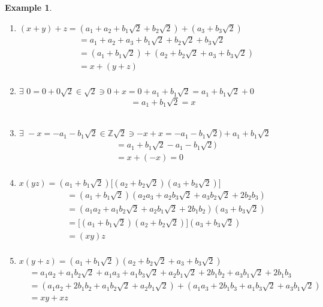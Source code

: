 \documentclass[11pt,a4paper]{article}
\theoremstyle{definition}
\newtheorem{exa}[thm]{Example}
\begin{document}
\begin{exa}
\begin{enumerate}
\begin{enumerate}
     
     \item[(ii)] $(x + y) + z = (a_1 + a_2 + b_1\sqrt{2} + b_2\sqrt{2}) + (a_3 + b_3\sqrt{2})$
     \begin{align*}
     & = a_1 + a_2 + a_3 + b_1\sqrt{2} + b_2\sqrt{2} + b_3\sqrt{2}\\ & = (a_1 + b_1\sqrt{2}) + (a_2 + b_2\sqrt{2} + a_3 + b_3\sqrt{2})\\
     & = x + (y + z)\\
     \end{align*}
     
     
     \item[(iii)] $\exists\,\, 0 = 0 + 0\sqrt{2} \in \sqrt{2} \ni 0 + x = 0 + a_1 + b_1\sqrt{2} = a_1 + b_1\sqrt{2} + 0 $
     $$ = a_1 + b_1\sqrt{2} = x$$\\
     
     
     \item[(iv)] $\exists\,\, - x = -a_1 - b_1\sqrt{2}\in \mathbb{Z}\sqrt{2} \ni -x + x = -a_1 - b_1\sqrt{2}) + a_1 + b_1\sqrt{2}$
     \begin{align*}
     & = a_1 + b_1\sqrt{2} - a_1 - b_1\sqrt{2})\\
     & = x + (-x) = 0\\
     \end{align*}
     
     
     \item[(v)] $x(yz) = (a_1 + b_1\sqrt{2})\big[(a_2 + b_2\sqrt{2})(a_3 + b_3\sqrt{2})\big] $
     \begin{align*}
     & = (a_1 + b_1\sqrt{2})(a_2a_3 + a_2b_3\sqrt{2} + a_3b_2\sqrt{2} + 2b_2b_3)\\
     & = (a_1a_2 + a_1b_2\sqrt{2} + a_2b_1\sqrt{2} + 2b_1b_2)( a_3 + b_3\sqrt{2})\\
     & = \big[( a_1 + b_1\sqrt{2})( a_2 + b_2\sqrt{2})\big]( a_3 + b_3\sqrt{2})\\
     & = (xy)z\\
     \end{align*}
     
     
     
     \item[(vi)] $x(y + z) =  (a_1 + b_1\sqrt{2})(a_2 + b_2\sqrt{2} + a_3 + b_3\sqrt{2})$
     \begin{align*}
     & = a_1a_2 + a_1b_2\sqrt{2} + a_1a_3 + a_1b_3\sqrt{2} + a_2b_1\sqrt{2} + 2b_1b_2 + a_3b_1\sqrt{2} + 2b_1b_3\\
     & = (a_1a_2 + 2b_1b_2 + a_1b_2\sqrt{2} + a_2b_1\sqrt{2}) + (a_1a_3 + 2b_1b_3 + a_1b_3\sqrt{2} + a_3b_1\sqrt{2})\\
     & = xy + xz\\
     \end{align*}
\end{enumerate}




\end{enumerate}
\end{exa}
\end{document}
